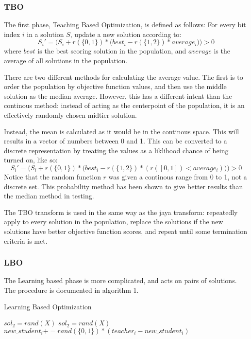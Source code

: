 \documentclass[11pt, letterpaper, onecolumn]{article}
\begin{document}
\subsubsection{TBO}

The first phase, Teaching Based Optimization, is defined as follows: For every bit index $i$ in a solution $S$, update a new solution according to: 
\begin{equation}
S_i' = \Big(S_i + r(\{0, 1\})*\big(best_i - r(\{1, 2\})*average_i\big)\Big) > 0
\end{equation}
where $best$ is the best scoring solution in the population, and $average$ is the average of all solutions in the population. 

There are two different methods for calculating the average value. The first is to order the population by objective function values, and then use the middle solution as the median average. However, this has a different intent than the continous method: instead of acting as the centerpoint of the population, it is an effectively randomly chosen midtier solution. 

Instead, the mean is calculated as it would be in the continous space. This will results in a vector of numbers between 0 and 1. This can be converted to a discrete representation by treating the values as a liklihood chance of being turned on, like so: 
\begin{equation}
S_i' = \Big(S_i + r(\{0, 1\})*\big(best_i - r(\{1, 2\})*(r([0, 1]) < average_i)\big)\Big) > 0
\end{equation}
Notice that the random function $r$ was given a continous range from 0 to 1, not a discrete set. This probability method has been shown to give better results than the median method in testing. 

The TBO transform is used in the same way as the jaya transform: repeatedly apply to every solution in the population, replace the solutions if the new solutions have better objective function scores, and repeat until some termination criteria is met. 

\subsubsection{LBO}

The Learning based phase is more complicated, and acts on pairs of solutions. The procedure is documented in algorithm 1. 

\begin{algorithm}
\caption{Learning Based Optimization}
\begin{algorithmic}
\STATE $sol_2 = rand(X)$
\STATE $sol_2 = rand(X)$
\ENDWHILE
{}
\STATE $new\_student_i \mathrel{{+}{=}} rand(\{0,1\}) * (teacher_i - new\_student_i)$
\ENDFOR
{}
\ENDIF
\ENDFOR
\end{algorithmic}
\end{algorithm}
\end{document}
